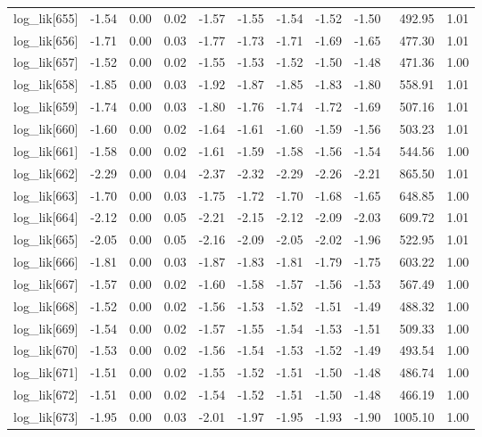 \begin{table}[ht]
\begin{tabular}{rrrrrrrrrrr}
  log\_lik[655] & -1.54 & 0.00 & 0.02 & -1.57 & -1.55 & -1.54 & -1.52 & -1.50 & 492.95 & 1.01 \\ 
  log\_lik[656] & -1.71 & 0.00 & 0.03 & -1.77 & -1.73 & -1.71 & -1.69 & -1.65 & 477.30 & 1.01 \\ 
  log\_lik[657] & -1.52 & 0.00 & 0.02 & -1.55 & -1.53 & -1.52 & -1.50 & -1.48 & 471.36 & 1.00 \\ 
  log\_lik[658] & -1.85 & 0.00 & 0.03 & -1.92 & -1.87 & -1.85 & -1.83 & -1.80 & 558.91 & 1.01 \\ 
  log\_lik[659] & -1.74 & 0.00 & 0.03 & -1.80 & -1.76 & -1.74 & -1.72 & -1.69 & 507.16 & 1.01 \\ 
  log\_lik[660] & -1.60 & 0.00 & 0.02 & -1.64 & -1.61 & -1.60 & -1.59 & -1.56 & 503.23 & 1.01 \\ 
  log\_lik[661] & -1.58 & 0.00 & 0.02 & -1.61 & -1.59 & -1.58 & -1.56 & -1.54 & 544.56 & 1.00 \\ 
  log\_lik[662] & -2.29 & 0.00 & 0.04 & -2.37 & -2.32 & -2.29 & -2.26 & -2.21 & 865.50 & 1.01 \\ 
  log\_lik[663] & -1.70 & 0.00 & 0.03 & -1.75 & -1.72 & -1.70 & -1.68 & -1.65 & 648.85 & 1.00 \\ 
  log\_lik[664] & -2.12 & 0.00 & 0.05 & -2.21 & -2.15 & -2.12 & -2.09 & -2.03 & 609.72 & 1.01 \\ 
  log\_lik[665] & -2.05 & 0.00 & 0.05 & -2.16 & -2.09 & -2.05 & -2.02 & -1.96 & 522.95 & 1.01 \\ 
  log\_lik[666] & -1.81 & 0.00 & 0.03 & -1.87 & -1.83 & -1.81 & -1.79 & -1.75 & 603.22 & 1.00 \\ 
  log\_lik[667] & -1.57 & 0.00 & 0.02 & -1.60 & -1.58 & -1.57 & -1.56 & -1.53 & 567.49 & 1.00 \\ 
  log\_lik[668] & -1.52 & 0.00 & 0.02 & -1.56 & -1.53 & -1.52 & -1.51 & -1.49 & 488.32 & 1.00 \\ 
  log\_lik[669] & -1.54 & 0.00 & 0.02 & -1.57 & -1.55 & -1.54 & -1.53 & -1.51 & 509.33 & 1.00 \\ 
  log\_lik[670] & -1.53 & 0.00 & 0.02 & -1.56 & -1.54 & -1.53 & -1.52 & -1.49 & 493.54 & 1.00 \\ 
  log\_lik[671] & -1.51 & 0.00 & 0.02 & -1.55 & -1.52 & -1.51 & -1.50 & -1.48 & 486.74 & 1.00 \\ 
  log\_lik[672] & -1.51 & 0.00 & 0.02 & -1.54 & -1.52 & -1.51 & -1.50 & -1.48 & 466.19 & 1.00 \\ 
  log\_lik[673] & -1.95 & 0.00 & 0.03 & -2.01 & -1.97 & -1.95 & -1.93 & -1.90 & 1005.10 & 1.00 \\ 

\end{tabular}
\end{table}
